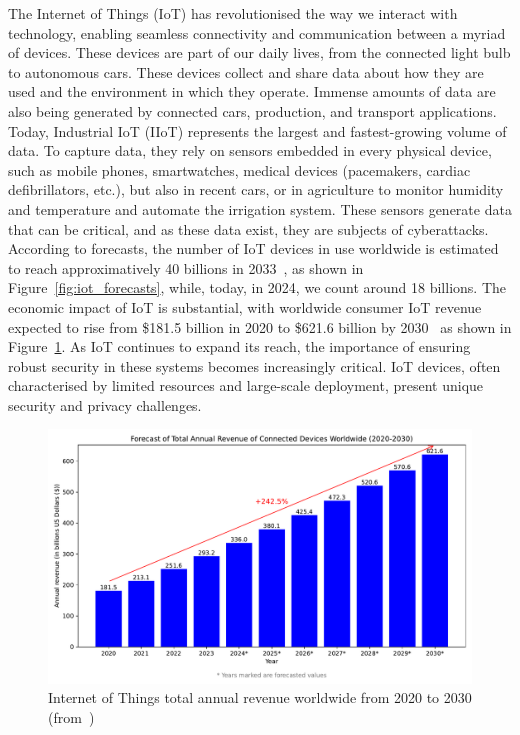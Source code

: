 The Internet of Things (IoT) has revolutionised the way we interact with technology, enabling seamless connectivity and communication between a myriad of devices. These devices are part of our daily lives, from the connected light bulb to autonomous cars. These devices collect and share data about how they are used and the environment in which they operate.  Immense amounts of data are also being generated by connected cars, production, and transport applications. Today, Industrial IoT (IIoT) represents the largest and fastest-growing volume of data.
To capture data, they rely on sensors embedded in every physical device, such as mobile phones, smartwatches, medical devices (pacemakers, cardiac defibrillators, etc.), but also in recent cars, or in agriculture to monitor humidity and temperature and automate the irrigation system. These sensors generate data that can be critical, and as these data exist, they are subjects of cyberattacks.
According to forecasts, the number of IoT devices in use worldwide is estimated to reach approximatively 40 billions in 2033~\cite{statista_iot}, as shown in Figure~\ref{fig:iot_forecasts}, while, today, in 2024, we count around 18 billions. The economic impact of IoT is substantial, with worldwide consumer IoT revenue expected to rise from \$181.5 billion in 2020 to \$621.6 billion by 2030~\cite{statista_iot_revenu} as shown in Figure~\ref{fig:iot_revenue}.
As IoT continues to expand its reach, the importance of ensuring robust security in these systems becomes increasingly critical. IoT devices, often characterised by limited resources and large-scale deployment, present unique security and privacy challenges.

\begin{figure}[ht]
    \centering
    \includegraphics[width=\linewidth]{c1_intro/img/iot_revenue.pdf}
    \caption{Internet of Things total annual revenue worldwide from 2020 to 2030 (from~\cite{statista_iot_revenu})}
    \label{fig:iot_revenue}
\end{figure}


